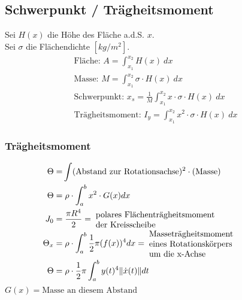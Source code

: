 \subsection{Schwerpunkt / Trägheitsmoment}
    Sei $H(x)$ die Höhe des Fläche a.d.S. $x$.\\
    Sei $\sigma$ die Flächendichte $[kg/m^2]$.
    \begin{align*}
        \textrm{Fläche: }  A = \int_{x_1}^{x_2} H(x)\ dx\\
        \textrm{Masse: }  M = \int_{x_1}^{x_2} \sigma \cdot H(x)\ dx\\
        \textrm{Schwerpunkt: }  x_s = \frac{1}{M} \int_{x_1}^{x_2} x \cdot \sigma \cdot H(x)\ dx\\
        \textrm{Trägheitsmoment: }  I_y = \int_{x_1}^{x_2} x^2 \cdot \sigma \cdot H(x)\ dx
    \end{align*}
    \subsubsection{Trägheitsmoment}
    \vspace*{-1em}
        \begin{align*}
            \Theta =& \int (\textrm{Abstand zur Rotationsachse})^2 \cdot (\textrm{Masse})\\
            \Theta =& \; \rho \cdot \int_a^b x^2 \cdot G(x) dx\\
            J_0 =& \; \frac{\pi R^4}{2} = \; \parbox{5cm}{polares Flächenträgheitsmoment\\ der Kreisscheibe}\\
            \Theta_x =& \; \rho \cdot \int_a^b \frac{1}{2} \pi (f(x))^4 dx = \; \parbox{5cm}{Masseträgheitsmoment\\ eines Rotationskörpers\\ um die x-Achse}\\
            \Theta =& \; \rho \cdot \frac{1}{2} \pi \int_a^{b} y(t)^4\|\dot{x}(t)\| dt
        \end{align*}
        $G(x) = \text{Masse an diesem Abstand}$